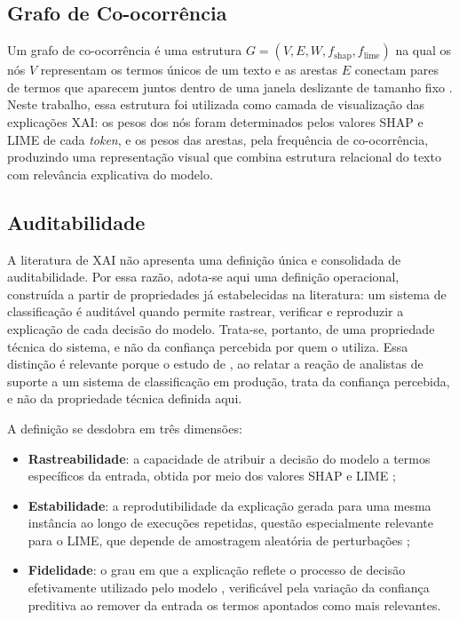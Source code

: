 \documentclass[
    12pt,                %
    openright,           %
    oneside,             %
    a4paper,             %
    english,             %
    brazil               %
]{abntex2}
\begin{document}
\subsection{Grafo de Co-ocorrência}
 
Um grafo de co-ocorrência é uma estrutura $G = (V, E, W, f_{\text{shap}}, f_{\text{lime}})$ na qual os nós $V$ representam os termos únicos de um texto e as arestas $E$ conectam pares de termos que aparecem juntos dentro de uma janela deslizante de tamanho fixo \cite{yao2019}. 
Neste trabalho, essa estrutura foi utilizada como camada de visualização das explicações XAI: os pesos dos nós foram determinados pelos valores SHAP e LIME de cada \textit{token}, e os pesos das arestas, pela frequência de co-ocorrência, produzindo uma representação visual que combina estrutura relacional do texto com relevância explicativa do modelo.

\subsection{Auditabilidade}
\label{subsec:auditabilidade}

A literatura de XAI não apresenta uma definição única e consolidada de
auditabilidade. Por essa razão, adota-se aqui uma definição operacional,
construída a partir de propriedades já estabelecidas na literatura: um
sistema de classificação é auditável quando permite rastrear, verificar
e reproduzir a explicação de cada decisão do modelo. Trata-se, portanto,
de uma propriedade técnica do sistema, e não da confiança percebida por
quem o utiliza. Essa distinção é relevante porque o estudo de , 
ao relatar a reação de analistas de suporte a um sistema de classificação 
em produção, trata da confiança percebida, e não da propriedade técnica definida aqui.

A definição se desdobra em três dimensões:

\begin{itemize}
    \item \textbf{Rastreabilidade}: a capacidade de atribuir a decisão
    do modelo a termos específicos da entrada, obtida por meio dos
    valores SHAP \cite{lundberg2017} e LIME \cite{ribeiro2016};

    \item \textbf{Estabilidade}: a reprodutibilidade da explicação
    gerada para uma mesma instância ao longo de execuções repetidas,
    questão especialmente relevante para o LIME, que depende de
    amostragem aleatória de perturbações \cite{salih2023};

    \item \textbf{Fidelidade}: o grau em que a explicação reflete o
    processo de decisão efetivamente utilizado pelo modelo
    \cite{jacovi2020}, verificável pela variação da confiança preditiva
    ao remover da entrada os termos apontados como mais relevantes.
\end{itemize}
\end{document}
